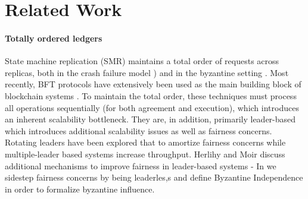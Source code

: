 
\section{Related Work}  
\paragraph{Totally ordered ledgers}
State machine replication (SMR) \cite{schneider1990implementing} maintains a total order of requests across replicas, both in the crash failure model  \cite{Li2007, Lampson2001, Lamport98Paxos, Lamport2005a, Lamport2005, Lamport01Paxos, Chandra2007}  \cite{junqueira2011zab, van2014vive, oki1988viewstampeda, liskov2012viewstamped, ongaro2014search}) and in the byzantine setting \cite{castro1999practical, martin2006fast, kotla2007zyzzyva,  gueta2018sbft, clement2009making, buchman2016tendermint, yin2019hotstuff, Clement09Upright, duan2014hbft    , pires2018generalized, bessani2014state, lamport2011byzantizing, arun2019ezbft, malkhi2019flexible, duan2014hbft, yin2003separating, Guerraoui08Next, Kotla04High,  liskov2010viewstamped}. Most recently, BFT protocols have extensively been used as the main building block of blockchain systems \cite{Hyperledger, EthereumQuorum, buchman2016tendermint, al2017chainspace, kokoris2018omniledger,  gilad2017algorand, baudet2019state}. To maintain the total order, these techniques must process  all operations sequentially (for both agreement and execution), which introduces an inherent scalability bottleneck. They are, in addition, primarily leader-based which introduces additional scalability issues \cite{moraru2013there, zhang2015tapir, stathakopoulou2019mir} as well as fairness concerns. \\
Rotating leaders \cite{clement2009making, buchman2016tendermint, yin2019hotstuff} have been explored that to amortize fairness concerns while multiple-leader based systems \cite{moraru2013there, stathakopoulou2019mir, arun2019ezbft, li2016sarek} increase throughput. Herlihy and Moir \cite{herlihy2016enhancing} discuss additional mechanisms to improve fairness in leader-based systems - In \sys we sidestep fairness concerns by being leaderles,s and define Byzantine Independence in order to formalize byzantine influence.
